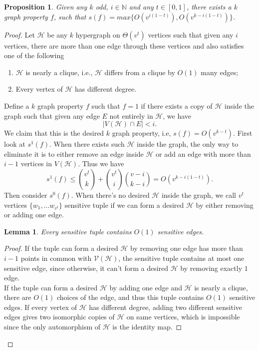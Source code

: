 \documentclass[psamsfonts]{amsart}
\newtheorem{prop}[theorem]{Proposition}
\newtheorem{lem}[theorem]{Lemma}
\theoremstyle{definition}
\theoremstyle{remark}
\numberwithin{equation}{section}
\begin{document}
	\begin{prop}
		Given any $k$ odd, $i \in \mathbb{N}$ and any $t \in [0,1]$, there exists a $k$ graph property $f$, such that $s(f) = max\{O(v^{i(1-t)}), O(v^{k-i(1-t)})\}$.
	\end{prop}
	\begin{proof}
		Let $\mathcal{H}$ be any $k$ hypergraph on $\Theta(v^t)$ vertices such that given any $i$ vertices, there are more than one edge through these vertices and also satisfies one of the following
		\begin{enumerate}
			\item $\mathcal{H}$ is nearly a clique, i.e., $\mathcal{H}$ differs from a clique by $O(1)$ many edges;
			\item Every vertex of $\mathcal{H}$ has different degree.
		\end{enumerate}
		 Define a $k$ graph property $f$ such that $f=1$ if there exists a copy of $\mathcal{H}$ inside the graph such that given any edge $E$ not entirely in $\mathcal{H}$, we have
		\begin{equation}
			|V(\mathcal{H}) \cap E| < i.
		\end{equation}
		\indent We claim that this is the desired $k$ graph property, i.e, $s(f) = O(v^{k-t})$. First look at $s^1(f)$. When there exists such $\mathcal{H}$ inside the graph, the only way to eliminate it is to either remove an edge inside $\mathcal{H}$ or add an edge with more than $i-1$ vertices in $V(\mathcal{H})$. Thus we have
		\begin{equation}
			s^1(f) \leq {v^t \choose{k}} + {v^t \choose{i}}{v-i \choose{k-i}} = O(v^{k-i(1-t)}).
		\end{equation}
		Then consider $s^0(f)$. When there's no desired $\mathcal{H}$ inside the graph, we call $v^t$ vertices $\{w_1,...w_{v^t}\}$ sensitive tuple if we can form a desired $\mathcal{H}$ by either removing or adding one edge. 
		\begin{lem}
			Every sensitive tuple contains $O(1)$ sensitive edges.
		\end{lem}
		\begin{proof}
			If the tuple can form a desired $\mathcal{H}$ by removing one edge has more than $i-1$ points in common with $\mathcal{V}(\mathcal{H})$, the sensitive tuple contains at most one sensitive edge, since otherwise, it can't form a desired $\mathcal{H}$ by removing exactly $1$ edge.\\
			\indent If the tuple can form a desired $\mathcal{H}$ by adding one edge and $\mathcal{H}$ is nearly a clique, there are $O(1)$ choices of the edge, and thus this tuple contains $O(1)$ sensitive edges. If every vertex of $\mathcal{H}$ has different degree, adding two different sensitive edges gives two isomorphic copies of $\mathcal{H}$ on same vertices, which is impossible since the only automorphism of $\mathcal{H}$ is the identity map.

\end{proof}
\end{proof}
\end{document}
